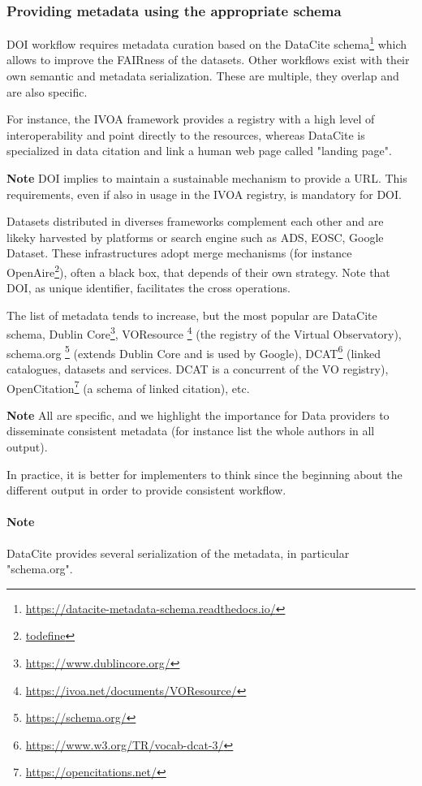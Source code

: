 \documentclass[11pt,a4paper]{ivoa}
\newcommand{\important}[1]{
	\begin{bigdescription}
		\item \color{ivoacolor}\textbf{Note} #1
	\end{bigdescription}
}
\begin{document}
\subsubsection{Providing metadata using the appropriate schema}
\label{sec:bestpractice:providing}
DOI workflow requires metadata curation based on the DataCite schema\footnote{\url{https://datacite-metadata-schema.readthedocs.io/}} which allows to improve the FAIRness of the datasets. Other workflows exist with their own semantic and metadata serialization. These are multiple, they overlap and are also specific.

For instance, the IVOA framework provides a registry with a high level  of interoperability and point directly to the resources, whereas DataCite is specialized in data citation and link a human web page called "landing page".

\important{
DOI implies to maintain a sustainable mechanism to provide a URL. 
This requirements, even if also in usage in the IVOA registry, is mandatory for DOI.
}

Datasets distributed in diverses frameworks complement each other and are likeky harvested by platforms or search engine such as ADS, EOSC, Google Dataset. These infrastructures adopt merge mechanisms (for instance OpenAire\footnote{\url{todefine}}), often a black box, that depends of their own strategy. Note that DOI, as unique identifier, facilitates the cross operations.

The list of metadata tends to increase, but the most popular are DataCite schema, Dublin Core\footnote{\url{https://www.dublincore.org/}}, VOResource \footnote{\url{https://ivoa.net/documents/VOResource/}} (the registry of the Virtual Observatory), schema.org \footnote{\url{https://schema.org/}} (extends Dublin Core and is used by Google), DCAT\footnote{\url{https://www.w3.org/TR/vocab-dcat-3/}} (linked catalogues, datasets and services. DCAT is a concurrent of the VO registry), OpenCitation\footnote{\url{https://opencitations.net/}} (a schema of linked citation),  etc.

\important{
All are specific, and we highlight the importance for Data providers to disseminate consistent metadata
(for instance list the whole authors in all output).
}

In practice, it is better for implementers to think since the beginning about the different output in order to provide consistent workflow.

\paragraph{Note} DataCite provides several serialization of the metadata, in particular "schema.org".
\end{document}
